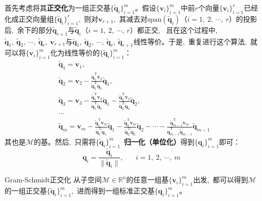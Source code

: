 \documentclass[10pt, a4paper, oneside, fontset=none]{ctexart}
\theoremstyle{plain}
\theoremstyle{definition}
\newcommand{\com}{,\,\,\,\:}
\newcommand{\di}[2][]{\begin{theo}{#1}\run #2\end{theo}}
\newcommand{\R}{\mathbb{R}}
\newcommand{\tbome}[1]{\textbf{\run\color{meihong!75!black}#1}}
\begin{document}
首先考虑将其\tbome{正交化}为一组正交基$\{\tilde{\boldsymbol{q}} _i\}_{i=1}^m$。假设$\{\boldsymbol{v}_i\}_{i=1}^m$中前$r$个向量$\{\boldsymbol{v}_i\}_{i=1}^r$已经化成正交向量组$\{\tilde{\boldsymbol{q}}_i\}_{i=1}^r$\com 则对$\boldsymbol{v}_{r+1}$\com 其减去对$\mathrm{span}(\tilde{\boldsymbol{q}} _i)$（$i=1,~2,~\cdots,~r$）的投影后\com 余下的部分$\tilde{\boldsymbol{q}}_{r+1}$与$\tilde{\boldsymbol{q}}_i$（$i=1,~2,~\cdots,~r$）都正交\com 
且在这个过程中\com $\tilde{\boldsymbol{q}}_{1},~\tilde{\boldsymbol{q}}_{2},~\cdots,~\tilde{\boldsymbol{q}}_{r},~\boldsymbol{v}_{r+1}$与$\tilde{\boldsymbol{q}}_{1},~\tilde{\boldsymbol{q}}_{2},~\cdots,~\tilde{\boldsymbol{q}}_{r},~\tilde{\boldsymbol{q}}_{r+1}$线性等价。于是\com 重复进行这个算法\com 就可以将$\{\boldsymbol{v}_i\}_{i=1}^m$化为线性等价的$\{\tilde{\boldsymbol{q}} _i\}_{i=1}^m$：\label{Gram-Schmidt正交化公式}
\begin{equation*}\begin{aligned}
    &\tilde{\boldsymbol{q}}_{1} =\boldsymbol{v}_{1}\com \\
    &\tilde{\boldsymbol{q}}_{2} =\boldsymbol{v}_{2}-\frac{\tilde{\boldsymbol{q}}_{1}^{\mathrm{T}}\boldsymbol{v}_{2}}{\tilde{\boldsymbol{q}}_{1}^{\mathrm{T}}\tilde{\boldsymbol{q}}_{1}}\tilde{\boldsymbol{q}}_{1}\com \\
    &\tilde{\boldsymbol{q}}_{3} =\boldsymbol{v}_{3}-\frac{\tilde{\boldsymbol{q}}_{1}^{\mathrm{T}}\boldsymbol{v}_{3}}{\tilde{\boldsymbol{q}}_{1}^{\mathrm{T}}\tilde{\boldsymbol{q}}_{1}}\tilde{\boldsymbol{q}}_{1}-\frac{\tilde{\boldsymbol{q}}_{2}^{\mathrm{T}}\boldsymbol{v}_{3}}{\tilde{\boldsymbol{q}}_{2}^{\mathrm{T}}\tilde{\boldsymbol{q}}_{2}}\tilde{\boldsymbol{q}}_{2}\com \\
    &\cdots\\
    &\tilde{\boldsymbol{q}}_{m}=\boldsymbol{v}_{m}-\frac{\tilde{\boldsymbol{q}}_{1}^{\mathrm{T}}\boldsymbol{v}_{m}}{\tilde{\boldsymbol{q}}_{1}^{\mathrm{T}}\tilde{\boldsymbol{q}}_{1}}\tilde{\boldsymbol{q}}_{1}-\frac{\tilde{\boldsymbol{q}}_{2}^{\mathrm{T}}\boldsymbol{v}_{m}}{\tilde{\boldsymbol{q}}_{2}^{\mathrm{T}}\tilde{\boldsymbol{q}}_{2}}\tilde{\boldsymbol{q}}_{2}-\cdots-\frac{\tilde{\boldsymbol{q}}_{m-1}^{\mathrm{T}}\boldsymbol{v}_{m}}{\tilde{\boldsymbol{q}}_{m-1}^{\mathrm{T}}\tilde{\boldsymbol{q}}_{m-1}}\tilde{\boldsymbol{q}}_{m-1}
\end{aligned}\end{equation*}
其也是$\mathcal{M}$的基。然后\com 只需将$\{\tilde{\boldsymbol{q}} _i\}_{i=1}^m$~\tbome{归一化（单位化）}得到$\{\boldsymbol{q}_i\}_{i=1}^m$即可：
$$\boldsymbol{q}_{i}=\frac{\tilde{\boldsymbol{q}}_{i}}{\|\tilde{\boldsymbol{q}}_{i}\|}\com \quad i=1,~2,~\cdots,~m$$
\di[Gram-Schmidt正交化]{
    从子空间$\mathcal{M}\in \R^n$的任意一组基$\{\boldsymbol{v}_i\}_{i=1}^m$出发\com 都可以得到$\mathcal{M}$的一组正交基$\{\tilde{\boldsymbol{q}} _i\}_{i=1}^m$\com 进而得到一组标准正交基$\{\boldsymbol{q}_i\}_{i=1}^m$。
}
\end{document}
